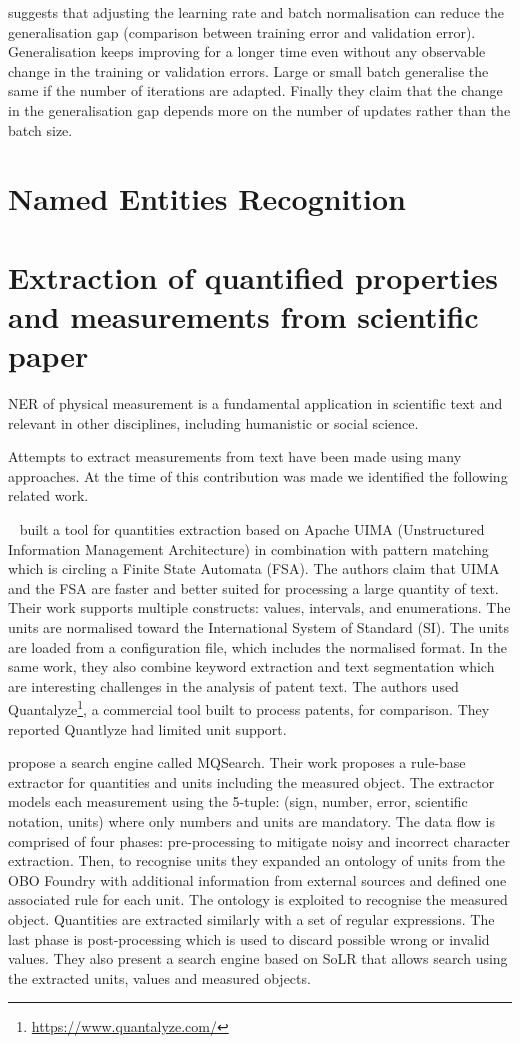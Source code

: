\cite{hoffer2017train} suggests that adjusting the learning rate and batch normalisation can reduce the generalisation gap (comparison between training error and validation error). Generalisation keeps improving for a longer time even without any observable change in the training or validation errors. Large or small batch generalise the same if the number of iterations are adapted. 
Finally they claim that the change in the generalisation gap depends more on the number of updates rather than the batch size. 

\section{Named Entities Recognition}

\section{Extraction of quantified properties and measurements from scientific paper} 
NER of physical measurement is a fundamental application in scientific text and relevant in other disciplines, including humanistic or social science. 

Attempts to extract measurements from text have been made using many approaches. At the time of this contribution was made we identified the following related work. 

~\cite{aras2014applications} built a tool for quantities extraction based on Apache UIMA (Unstructured Information Management Architecture) in combination with pattern matching which is circling a Finite State Automata (FSA). 
The authors claim that UIMA and the FSA are faster and better suited for processing a large quantity of text.
Their work supports multiple constructs: values, intervals, and enumerations. The units are normalised toward the International System of Standard (SI). 
The units are loaded from a configuration file, which includes the normalised format. In the same work, they also combine keyword extraction and text segmentation which are interesting challenges in the analysis of patent text. 
The authors used Quantalyze\footnote{\url{https://www.quantalyze.com/}}, a commercial tool built to process patents, for comparison. They reported Quantlyze had limited unit support. 

\cite{maiya2015mining} propose a search engine called MQSearch. Their work proposes a rule-base extractor for quantities and units including the measured object. The extractor models each measurement using the 5-tuple: (sign, number, error, scientific notation, units) where only numbers and units are mandatory. 
The data flow is comprised of four phases: pre-processing to mitigate noisy and incorrect character extraction. 
Then, to recognise units they expanded an ontology of units from the OBO Foundry with additional information from external sources and defined one associated rule for each unit. The ontology is exploited to recognise the measured object. 
Quantities are extracted similarly with a set of regular expressions. 
The last phase is post-processing which is used to discard possible wrong or invalid values. 
They also present a search engine based on SoLR that allows search using the extracted units, values and measured objects. 

